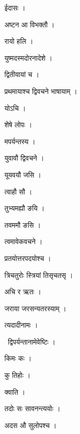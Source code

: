 \documentclass[10pt, openany, oneside]{book}
\begin{document}
\noindent ईदासः ।

\noindent अष्टन आ विभक्तौ ।

\noindent रायो हलि ।

\noindent युष्मदस्मदोरनादेशे ।

\noindent द्वितीयायां च ।

\noindent प्रथमायाश्च द्विवचने भाषायाम् ।

\noindent योऽचि ।

\noindent शेषे लोपः ।

\noindent मपर्यन्तस्य ।

\noindent युवावौ द्विवचने ।

\noindent यूयवयौ जसि ।

\noindent त्वाहौ सौ ।

\noindent तुभ्यमह्यौ ङयि ।

\noindent तवममौ ङसि ।

\noindent त्वमावेकवचने ।

\noindent प्रतयोत्तरपदयोश्च ।

\noindent त्रिचतुरोः स्त्रियां तिसृचतसृ ।

\noindent अचि र ऋतः ।

\noindent जराया जरसन्यतरस्याम् ।

\noindent त्यदादीनामः ।

\par\noindent\hspace{1.5em}{\vps वा॰}~{\qt द्विपर्यन्तानामेवेष्टिः ।}

\noindent किमः कः ।

\noindent कु तिहोः ।

\noindent क्वाति ।

\noindent तदोः सः सावनन्त्ययोः ।

\noindent अदस औ सुलोपश्च ।
\end{document}

